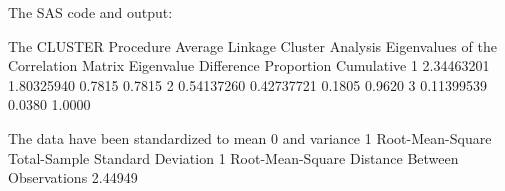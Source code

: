 \documentclass{article}
\begin{document}
The SAS code and output:
\begin{Woutput}
The CLUSTER Procedure
Average Linkage Cluster Analysis
            Eigenvalues of the Correlation Matrix
        Eigenvalue    Difference    Proportion    Cumulative
   1    2.34463201    1.80325940        0.7815        0.7815
   2    0.54137260    0.42737721        0.1805        0.9620
   3    0.11399539                      0.0380        1.0000

The data have been standardized to mean 0 and variance 1
Root-Mean-Square Total-Sample Standard Deviation           1
Root-Mean-Square Distance Between Observations     2.44949


\end{Woutput}
\end{document}
